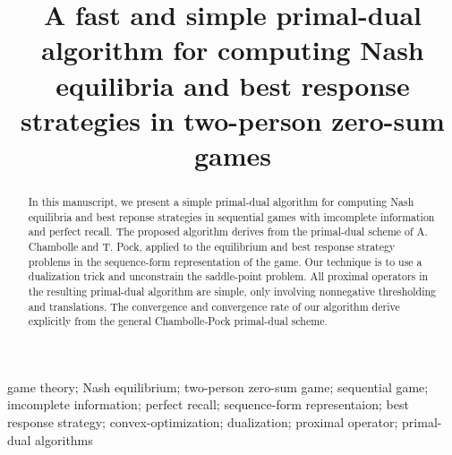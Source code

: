 \documentclass[a4paper,9pt,journal]{IEEEtran}
\begin{document}
\onecolumn
\title{A fast and simple primal-dual algorithm for computing Nash equilibria and best response strategies in two-person zero-sum games}


\author{}


\maketitle

\begin{abstract}
% 
In this manuscript, we present a simple primal-dual algorithm for computing Nash equilibria and best reponse strategies in  sequential games with
imcomplete information and perfect recall. The proposed algorithm derives from the primal-dual scheme of A. Chambolle and T. Pock, applied to the
equilibrium and best response strategy problems in the sequence-form representation of the game. Our technique is to use a dualization
trick and unconstrain the saddle-point problem. All proximal operators in the resulting primal-dual algorithm are simple,
only involving nonnegative thresholding and translations.
The convergence and convergence rate of our algorithm derive explicitly from the general Chambolle-Pock primal-dual scheme.

\end{abstract}


\begin{IEEEkeywords}
  game theory; Nash equilibrium; two-person zero-sum game; sequential game; imcomplete information; perfect recall; sequence-form representaion;
  best response strategy; convex-optimization; dualization; proximal operator; primal-dual algorithms
\end{IEEEkeywords}
\end{document}
